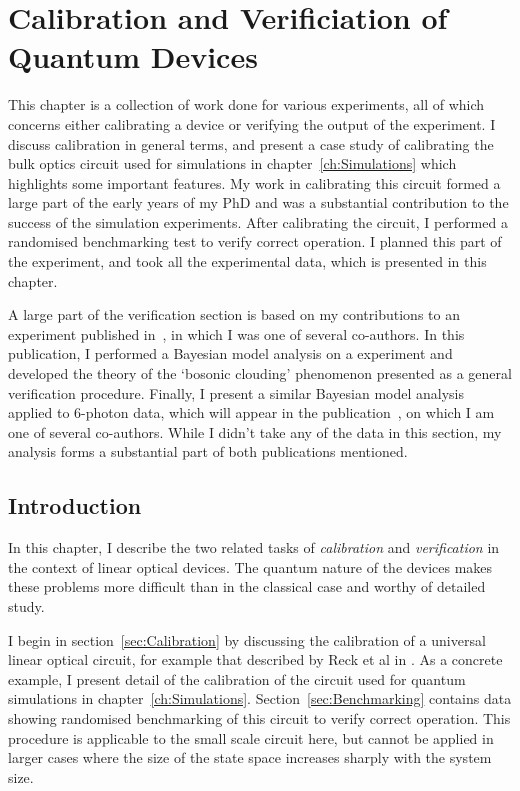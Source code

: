 \chapter{Calibration and Verificiation of Quantum Devices}
\label{ch:QCV}
This chapter is a collection of work done for various experiments, all of which
concerns either calibrating a device or verifying the output of the experiment.
I discuss calibration in general terms, and present a case study of calibrating
the bulk optics circuit used for simulations in chapter~\ref{ch:Simulations}
which highlights some important features. My work in calibrating this circuit
formed a large part of the early years of my PhD and was a substantial
contribution to the success of the simulation experiments. After calibrating the
circuit, I performed a randomised benchmarking test to verify correct operation.
I planned this part of the experiment, and took all the experimental data, which
is presented in this chapter.

A large part of the verification section is based on my contributions to an
experiment published in~\cite{verification}, in which I was one of several
co-authors. In this publication, I performed a Bayesian model analysis on a
\bosonsampling{} experiment and developed the theory of the `bosonic clouding'
phenomenon presented as a general verification procedure. Finally, I present a
similar Bayesian model analysis applied to 6-photon data, which will appear in
the publication~\cite{bigreck}, on which I am one of several co-authors. While I
didn't take any of the data in this section, my analysis forms a substantial
part of both publications mentioned.

\section{Introduction}
\label{sec:QCVIntro}
In this chapter, I describe the two related tasks of \emph{calibration} and
\emph{verification} in the context of linear optical devices. The
quantum nature of the devices makes these problems more difficult than in the
classical case and worthy of detailed study.

I begin in section~\ref{sec:Calibration} by discussing the calibration of a
universal linear optical circuit, for example that described by Reck et al in
\cite{reck}. As a concrete example, I present detail of the calibration of the
circuit used for quantum simulations in chapter~\ref{ch:Simulations}.
Section~\ref{sec:Benchmarking} contains data showing randomised benchmarking of
this circuit to verify correct operation. This procedure is applicable to the
small scale circuit here, but cannot be applied in larger cases where the size
of the state space increases sharply with the system size.

